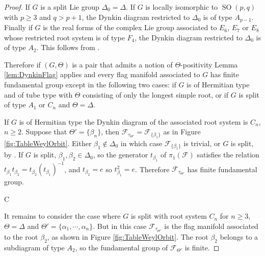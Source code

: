 \documentclass[reqno,10pt]{amsart}
\theoremstyle{plain}
\theoremstyle{definition}
\theoremstyle{remark}
\newcommand{\type}{\tau}
\DeclareMathOperator{\SO}{SO}
\begin{document}
\begin{proof}

If $G$ is a split Lie group $\Delta_0=\Delta$. If $G$ is locally isomorphic to $\SO(p,q)$ with $p\geq 3$ and $q>p+1$, the Dynkin diagram restricted to $\Delta_0$ is of type $A_{p-1}$. Finally if $G$ is the real forms of the complex Lie group associated to $E_6$, $E_7$ or $E_8$ whose restricted root system is of type $F_4$, the Dynkin diagram restricted to $\Delta_0$ is of type $A_2$. This follows from \cite[Table 9]{LieGroupTable}.

\medskip
 
 Therefore if $(G, \Theta)$ is a pair that admits a notion of $\Theta$-positivity Lemma \ref{lem:DynkinFlag} applies and every flag manifold associated to $G$ has finite fundamental group except in the following two cases: if $G$ is of Hermitian type and of tube type with $\Theta$ consisting of only the longest simple root, or if $G$ is split of type $A_1$ or $C_n$ and $\Theta=\Delta$.
 
\medskip

If $G$ is of Hermitian type the Dynkin diagram of the associated root system is $C_n$, $n\geq 2$. Suppose that $\Theta'=\lbrace\beta_n\rbrace$, then $\mathcal{F}_{\type_{\Theta'}}=\mathcal{F}_{\lbrace\beta_1\rbrace}$ as in Figure \ref{fig:TableWeylOrbit}. Either $\beta_1\notin \Delta_0$ in which case $\mathcal{F}_{\lbrace\beta_1\rbrace}$ is trivial, or $G$ is split, by \cite[Table 9]{LieGroupTable}.
If $G$ is split, $\beta_1,\beta_2\in \Delta_0$, so the generator $t_{\beta_1}$ of $\pi_1(\mathcal{F})$ satisfies the relation $t_{\beta_1} t_{\beta_2}=t_{\beta_2} \left(t_{\beta_1}\right)^{-1}$, and $t_{\beta_2}=e$ so $t_{\beta_1}^2=e$. Therefore $\mathcal{F}_{\type_{\Theta'}}$ has finite fundamental group.

\begin{center}
\dynkin[labels={\beta_1,\beta_2, \beta_{n-2}, \beta_{n-1}, \beta_n},
edge length=.75cm]C{}
\end{center}

It remains to consider the case where $G$ is split with root system $C_n$ for $n\geq 3$, $\Theta=\Delta$ and $\Theta'=\lbrace\alpha_1, \cdots ,\alpha_n\rbrace$. But in this case $\mathcal{F}_{\type_{\Theta'}}$ is the flag manifold associated to the root $\beta_2$, as shown in Figure \ref{fig:TableWeylOrbit}. The root $\beta_2$ belongs to a subdiagram of type $A_2$, so the fundamental group of $\mathcal{F}_{\Theta'}$ is finite.
\end{proof}
\end{document}
